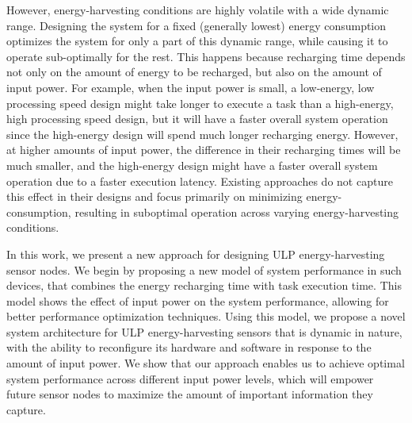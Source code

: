 However, energy-harvesting conditions are highly volatile with a wide dynamic range. 
%
Designing the system for a fixed (generally lowest) energy consumption optimizes the system for only a part of this dynamic range, while causing it to operate sub-optimally for the rest. 
%
This happens because recharging time depends not only on the amount of energy to be recharged, but also on the amount of input power. 
%
For example, when the input power is small, a low-energy, low processing speed design might take longer to execute a task than a high-energy, high processing speed design, but it will have a faster overall system operation since the high-energy design will spend much longer recharging energy. 
%
However, at higher amounts of input power, the difference in their recharging times will be much smaller, and the high-energy design might have a faster overall system operation due to a faster execution latency. 
%
Existing approaches do not capture this effect in their designs and focus primarily on minimizing energy-consumption, resulting in suboptimal operation across varying energy-harvesting conditions.

In this work, we present a new approach for designing ULP energy-harvesting sensor nodes.
%
We begin by proposing a new model of system performance in such devices, that combines the energy recharging time with task execution time. 
%
This model shows the effect of input power on the system performance, allowing for better performance optimization techniques. 
%
Using this model, we propose a novel system architecture for ULP energy-harvesting sensors that is dynamic in nature, with the ability to reconfigure its hardware and software in response to the amount of input power. 
%
We show that our approach enables us to achieve optimal system performance across different input power levels, which will empower future sensor nodes to maximize the amount of important information they capture.
